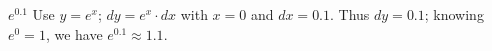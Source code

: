 {$e^{0.1}$
}
{Use $y = e^x$; $dy = e^x\cdot dx$ with $x=0$ and $dx =0.1$. Thus $dy = 0.1$; knowing $e^0=1$, we have $e^{0.1} \approx 1.1$.
}


